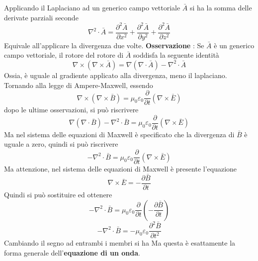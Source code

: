 \documentclass[10pt, letterpaper]{report}
\begin{document}
Applicando il Laplaciano ad un generico campo vettoriale $\bar A$ si ha la somma delle derivate parziali seconde
$$\nabla^2\cdot\bar A = \frac{\partial^2\bar A}{\partial x^2}+\frac{\partial^2\bar A}{\partial y^2}+\frac{\partial^2\bar A}{\partial z^2} $$
Equivale all'applicare la divergenza due volte.\acc 
\textbf{Osservazione} : Se $\bar A$ è un generico campo vettoriale, il rotore del rotore di $\bar A$ soddisfa la seguente identità 
$$\nabla \times (\nabla \times \bar A )=\nabla(\nabla \cdot \bar A)-\nabla^2\cdot \bar A $$
Ossia, è uguale al gradiente applicato alla divergenza, meno il laplaciano. Tornando alla legge di Ampere-Maxwell, essendo 
$$\nabla \times(\nabla \times \bar B )= \mu_0 \varepsilon_0 \dfrac{\partial }{\partial t}(\nabla \times \bar E)$$
dopo le ultime osservazioni, si può riscrivere 
$$ \nabla(\nabla \cdot \bar B)-\nabla^2\cdot \bar B=\mu_0 \varepsilon_0 \dfrac{\partial}{\partial t}(\nabla \times \bar E)$$ 
Ma nel sistema delle equazioni di Maxwell è specificato che la divergenza di $\bar B$ è uguale a zero, quindi si può riscrivere 
$$ -\nabla^2\cdot \bar B=\mu_0 \varepsilon_0 \dfrac{\partial }{\partial t}(\nabla \times \bar E)$$ 
Ma attenzione, nel sistema delle equazioni di Maxwell è presente l'equazione
$$\nabla \times \bar E = -\dfrac{\partial \bar B }{\partial t}$$ 
Quindi si può sostituire ed ottenere 
$$ -\nabla^2\cdot \bar B=\mu_0 \varepsilon_0 \dfrac{\partial }{\partial t}(-\dfrac{\partial \bar B }{\partial t})$$ 
$$ -\nabla^2\cdot \bar B=-\mu_0 \varepsilon_0 \dfrac{\partial^2\bar B}{\partial t^2}$$ 
Cambiando il segno ad entrambi i membri si ha 
Ma questa è esattamente la forma generale dell'\textbf{equazione di un onda}.
\end{document}
